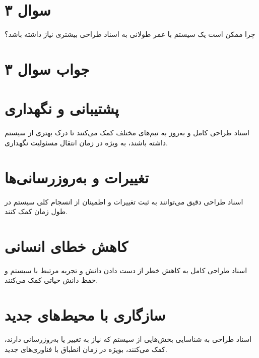 \section*{سوال ۳}

چرا ممکن است یک سیستم با عمر طولانی به اسناد طراحی بیشتری نیاز داشته باشد؟

\section*{جواب سوال ۳}

\section*{پشتیبانی و نگهداری}
اسناد طراحی کامل و به‌روز به تیم‌های مختلف کمک می‌کنند تا درک بهتری از سیستم داشته باشند، به ویژه در زمان انتقال مسئولیت نگهداری.

\section*{تغییرات و به‌روزرسانی‌ها}
اسناد طراحی دقیق می‌توانند به ثبت تغییرات و اطمینان از انسجام کلی سیستم در طول زمان کمک کنند.

\section*{کاهش خطای انسانی}
اسناد طراحی کامل به کاهش خطر از دست دادن دانش و تجربه مرتبط با سیستم و حفظ دانش حیاتی کمک می‌کنند.

\section*{سازگاری با محیط‌های جدید}
اسناد طراحی به شناسایی بخش‌هایی از سیستم که نیاز به تغییر یا به‌روزرسانی دارند، کمک می‌کنند، بویژه در زمان انطباق با فناوری‌های جدید.
